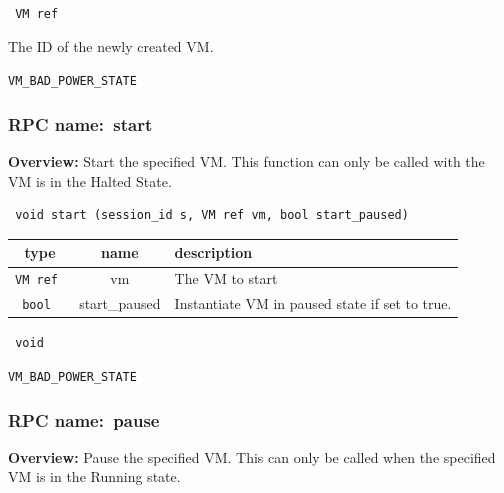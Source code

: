 \vspace{0.3cm}

{\tt 
VM ref
}


The ID of the newly created VM.
\vspace{0.3cm}

 {\tt VM\_BAD\_POWER\_STATE}

\vspace{0.6cm}
\subsubsection{RPC name:~start}

{\bf Overview:} 
Start the specified VM.  This function can only be called with the VM is in
the Halted State.

\begin{verbatim} void start (session_id s, VM ref vm, bool start_paused)\end{verbatim}



 
\vspace{0.3cm}
\begin{tabular}{|c|c|p{7cm}|}
 \hline
{\bf type} & {\bf name} & {\bf description} \\ \hline
{\tt VM ref } & vm & The VM to start \\ \hline 

{\tt bool } & start\_paused & Instantiate VM in paused state if set to true. \\ \hline 

\end{tabular}

\vspace{0.3cm}

{\tt 
void
}



\vspace{0.3cm}

 {\tt VM\_BAD\_POWER\_STATE}

\vspace{0.6cm}
\subsubsection{RPC name:~pause}

{\bf Overview:} 
Pause the specified VM. This can only be called when the specified VM is in
the Running state.

